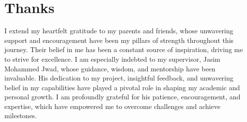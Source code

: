 \chapter*{Thanks}
I extend my heartfelt gratitude to my parents and friends, whose unwavering support and encouragement have been my pillars of strength throughout this journey. Their belief in me has been a constant source of inspiration, driving me to strive for excellence. I am especially indebted to my supervisor, Jasim Mohammed Jwad, whose guidance, wisdom, and mentorship have been invaluable. His dedication to my project, insightful feedback, and unwavering belief in my capabilities have played a pivotal role in shaping my academic and personal growth. I am profoundly grateful for his patience, encouragement, and expertise, which have empowered me to overcome challenges and achieve milestones. 
